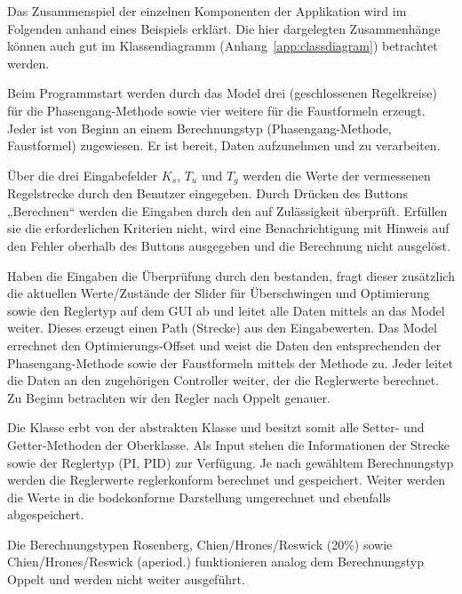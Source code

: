 Das Zusammenspiel der einzelnen Komponenten  der Applikation wird im Folgenden
anhand  eines   Beispiels  erkl\"art. Die  hier   dargelegten  Zusammenh\"ange
k\"onnen   auch   gut   im   Klassendiagramm   (Anhang~\ref{app:classdiagram})
betrachtet werden.

Beim   Programmstart   werden   durch  das   Model   drei   
(geschlossenen Regelkreise)  f\"ur die  Phasengang-Methode sowie  vier weitere
f\"ur  die Faustformeln  erzeugt. Jeder   ist von  Beginn an
einem  Berechnungstyp  (Phasengang-Methode,  Faustformel)  zugewiesen. Er  ist
bereit, Daten aufzunehmen und zu verarbeiten.

\"Uber die  drei Eingabefelder  $K_s$, $T_u$  und $T_g$  werden die  Werte der
vermessenen Regelstrecke  durch den  Benutzer eingegeben. Durch  Dr\"ucken des
Buttons  „Berechnen“ werden  die Eingaben  durch den   auf
Zul\"assigkeit  \"uberpr\"uft. Erf\"ullen  sie  die  erforderlichen  Kriterien
nicht,  wird eine  Benachrichtigung mit  Hinweis auf  den Fehler  oberhalb des
Buttons ausgegeben und die Berechnung nicht ausgel\"ost.

Haben  die   Eingaben  die  \"Uberpr\"ufung  durch   den  
bestanden, fragt dieser zus\"atzlich die aktuellen Werte/Zust\"ande der Slider
f\"ur \"Uberschwingen und  Optimierung sowie den Reglertyp auf dem  GUI ab und
leitet  alle  Daten  mittels    an  das  Model  weiter. Dieses
erzeugt einen  Path (Strecke) aus  den Eingabewerten. Das Model  errechnet den
Optimierungs-Offset und weist die  Daten den entsprechenden 
der  Phasengang-Methode  sowie  der Faustformeln  mittels  der
Methode  zu. Jeder   leitet  die Daten  an den  zugeh\"origen
Controller weiter, der die Reglerwerte berechnet. Zu Beginn betrachten wir den
Regler nach Oppelt genauer.

Die  Klasse   erbt  von der  abstrakten Klasse  
und  besitzt  somit  alle  Setter-  und  Getter-Methoden  der  Oberklasse. Als
Input  stehen die  Informationen der  Strecke  sowie der  Reglertyp (PI,  PID)
zur  Verf\"ugung. Je nach  gew\"ahltem Berechnungstyp  werden die  Reglerwerte
reglerkonform  berechnet  und  gespeichert. Weiter  werden die  Werte  in  die
bodekonforme Darstellung umgerechnet und ebenfalls abgespeichert.

Die    Berechnungstypen   Rosenberg,    Chien/Hrones/Reswick   (20\%)    sowie
Chien/Hrones/Reswick (aperiod.) funktionieren analog dem Berechnungstyp Oppelt
und werden nicht weiter ausgef\"uhrt.

